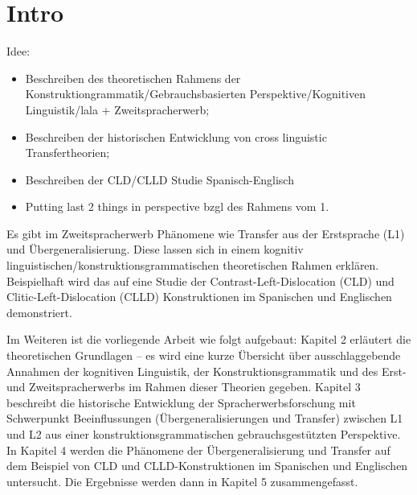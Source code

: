 \section{Intro}

\begin{comment}
* ca 3/4 Seiten
* Untersuchungsgegenstand
* Erkenntnisinteresse
* Forschungsstand
* Vorgehensweise: also Section 2 macht blabla, Section 3 blablup, ....
* Ergebnisse können/sollen angedeuten werden
\end{comment}

Idee:
\begin{itemize}
    \item Beschreiben des theoretischen Rahmens der Konstruktiongrammatik/Gebrauchsbasierten Perspektive/Kognitiven Linguistik/lala + Zweitspracherwerb;
    \item Beschreiben der historischen Entwicklung von cross linguistic Transfertheorien;
    \item Beschreiben der CLD/CLLD Studie Spanisch-Englisch
    \item Putting last 2 things in perspective bzgl des Rahmens vom 1.
\end{itemize}

Es gibt im Zweitspracherwerb Phänomene wie Transfer aus der Erstsprache (L1) und Übergeneralisierung.
Diese lassen sich in einem kognitiv linguistischen/konstruktionsgrammatischen theoretischen Rahmen erklären.
Beispielhaft wird das auf eine Studie der Contrast-Left-Dislocation (CLD) und Clitic-Left-Dislocation (CLLD) Konstruktionen im Spanischen und Englischen demonstriert.

Im Weiteren ist die vorliegende Arbeit wie folgt aufgebaut:
Kapitel 2 erläutert die theoretischen Grundlagen -- es wird eine kurze Übersicht über ausschlaggebende Annahmen der kognitiven Linguistik, der Konstruktionsgrammatik und des Erst- und Zweitspracherwerbs im Rahmen dieser Theorien gegeben.
Kapitel 3 beschreibt die historische Entwicklung der Spracherwerbsforschung mit Schwerpunkt Beeinflussungen (Übergeneralisierungen und Transfer) zwischen L1 und L2 aus einer konstruktionsgrammatischen gebrauchsgestützten Perspektive.
In Kapitel 4 werden die Phänomene der Übergeneralisierung und Transfer auf dem Beispiel von CLD und CLLD-Konstruktionen im Spanischen und Englischen untersucht.
Die Ergebnisse werden dann in Kapitel 5 zusammengefasst. %
